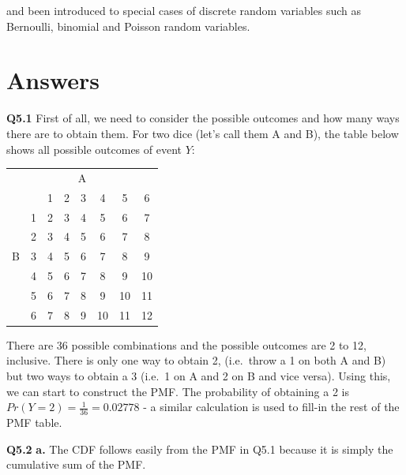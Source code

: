 \documentclass[
  oneside]{krantz}
\begin{document}
and been introduced to special cases of discrete random variables such as Bernoulli, binomial and Poisson random variables.

\hypertarget{ANSdiscrv}{%
\section{Answers}\label{ANSdiscrv}}

\textbf{Q5.1} First of all, we need to consider the possible outcomes and how many ways there are to obtain them. For two dice (let's call them A and B), the table below shows all possible outcomes of event \(Y\):

\begin{center}
\begin{tabular} {l l|c|c|c|c|c|c}
\multicolumn{8}{c}{A}\\
 & & 1 & 2 & 3 & 4 & 5 & 6 \\
\hline
  & 1 & 2 & 3 & 4 & 5 & 6 & 7\\
  & 2 & 3 & 4 & 5 & 6 & 7 & 8\\
B & 3 & 4 & 5 & 6 & 7 & 8 & 9\\
  & 4 & 5 & 6 & 7 & 8 & 9 & 10 \\
  & 5 & 6 & 7 & 8 & 9 & 10 & 11 \\
  & 6 & 7 & 8 & 9 & 10 & 11 & 12\\
\hline
\end{tabular}
\end{center}

There are 36 possible combinations and the possible outcomes are 2 to 12, inclusive. There is only one way to obtain 2, (i.e.~throw a 1 on both A and B) but two ways to obtain a 3 (i.e.~1 on A and 2 on B and vice versa). Using this, we can start to construct the PMF. The probability of obtaining a 2 is \(Pr(Y=2) = \frac{1}{36} = 0.02778\) - a similar calculation is used to fill-in the rest of the PMF table.

\textbf{Q5.2} \textbf{a.} The CDF follows easily from the PMF in Q5.1 because it is simply the cumulative sum of the PMF.
\end{document}
